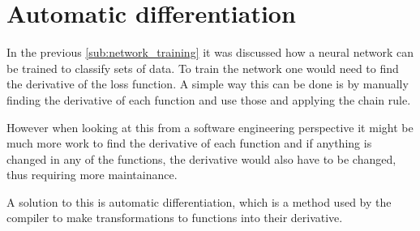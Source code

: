 \section{Automatic differentiation}%
\label{sec:autodiff}

In the previous \autoref{sub:network_training} it was discussed how a neural network can be trained to classify sets of data. To train the network one would need to find the derivative of the loss function. A simple way this can be done is by manually finding the derivative of each function and use those and applying the chain rule.

However when looking at this from a software engineering perspective it might be much more work to find the derivative of each function and if anything is changed in any of the functions, the derivative would also have to be changed, thus requiring more maintainance.

A solution to this is automatic differentiation, which is a method used by the compiler to make transformations to functions into their derivative.



